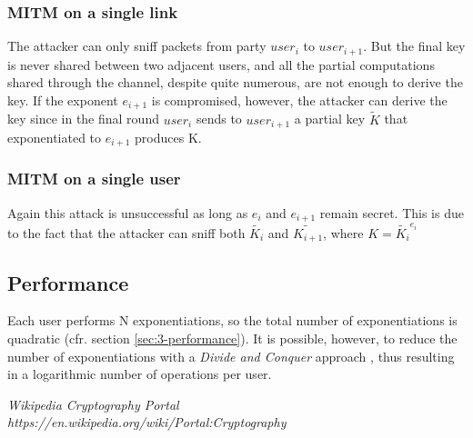 \documentclass[11 pt]{article}
\begin{document}
\subsubsection{MITM on a single link}
The attacker can only sniff packets from party \textit{$user_i$} to \textit{$user_{i+1}$}. But the final key is never shared between two adjacent users, and all the partial computations shared through the channel, despite quite numerous, are not enough to derive the key. If the exponent $e_{i+1}$ is compromised, however, the attacker can derive the key since in the final round \textit{$user_i$} sends to \textit{$user_{i+1}$} a partial key $\widetilde{K}$ that exponentiated to $e_{i+1}$ produces K. 

\subsubsection{MITM on a single user}
Again this attack is unsuccessful as long as $e_i$ and $e_{i+1}$ remain secret. This is due to the fact that the attacker can sniff both $\widetilde{K_i}$ and $\widetilde{K_{i+1}}$, where $K = \widetilde{K_i} ^ {e_i}$ 

\subsection{Performance}
Each user performs N exponentiations, so the total number of exponentiations is quadratic (cfr. section \ref{sec:3-performance}). It is possible, however, to reduce the number of exponentiations with a \textit{Divide and Conquer} approach \cite{Wikipedia}, thus resulting in a logarithmic number of operations per user.


\begin{thebibliography}{10}
		
	\textsl{Wikipedia Cryptography Portal} \\
	\textit{https://en.wikipedia.org/wiki/Portal:Cryptography}
	
\end{thebibliography}
\end{document}
